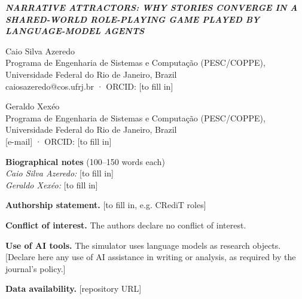 \documentclass[12pt]{article}
\begin{document}
\noindent\textbf{\textit{NARRATIVE ATTRACTORS: WHY STORIES CONVERGE IN A SHARED-WORLD ROLE-PLAYING GAME PLAYED BY LANGUAGE-MODEL AGENTS}}

\bigskip
\noindent Caio Silva Azeredo\\
Programa de Engenharia de Sistemas e Computação (PESC/COPPE), Universidade Federal do Rio de Janeiro, Brazil\\
caiosazeredo@cos.ufrj.br · ORCID: [to fill in]

\medskip
\noindent Geraldo Xexéo\\
Programa de Engenharia de Sistemas e Computação (PESC/COPPE), Universidade Federal do Rio de Janeiro, Brazil\\
{[e-mail]} · ORCID: [to fill in]

\bigskip
\noindent\textbf{Biographical notes} (100--150 words each)\\
\textit{Caio Silva Azeredo:} {[to fill in]}\\
\textit{Geraldo Xexéo:} {[to fill in]}

\bigskip
\noindent\textbf{Authorship statement.} [to fill in, e.g. CRediT roles]

\noindent\textbf{Conflict of interest.} The authors declare no conflict of interest.

\noindent\textbf{Use of AI tools.} The simulator uses language models as research objects. [Declare here any use of AI assistance in writing or analysis, as required by the journal's policy.]

\noindent\textbf{Data availability.} [repository URL]
\end{document}
